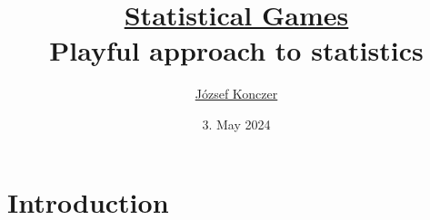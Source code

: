 \documentclass{beamer}
\theoremstyle{definition}
\begin{document}



\title[\href{https://arxiv.org/abs/2402.15892}{Statistical Games}]{\href{https://arxiv.org/abs/2402.15892}{Statistical Games} \\ {\small Playful approach to statistics}}
\author{\href{https://konczer.github.io/}{József Konczer}}
\date{3. May 2024}

\begin{frame}
\titlepage
\end{frame}





\section{Introduction}
\end{document}

